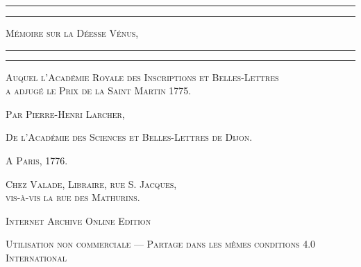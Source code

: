 \documentclass[a4paper, 18pt, oneside]{article}
\begin{document}
\begin{titlepage} %
	\centering %

	
	\rule{\textwidth}{1.6pt}\vspace*{-\baselineskip}\vspace*{2pt} %
	\rule{\textwidth}{0.4pt} %
	
	\vspace{1\baselineskip} %
	
	{\scshape\Huge Mémoire sur la Déesse Vénus,}
	
	\vspace{1\baselineskip} %

	\rule{\textwidth}{0.4pt}\vspace*{-\baselineskip}\vspace{3.2pt} %
	\rule{\textwidth}{1.6pt} %
	
	\vspace{1\baselineskip} %
	

 {\scshape Auquel l'Académie Royale des Inscriptions et Belles-Lettres\\ a adjugé le Prix de la Saint Martin 1775.} %

 	\vspace*{1\baselineskip} %

	{\scshape \Large Par Pierre-Henri Larcher,} %

 	\vspace*{1\baselineskip} %

{\scshape De l'Académie des Sciences et Belles-Lettres de Dijon.} %

\vspace*{\fill}

	\vspace{1\baselineskip}

	{\small\scshape A Paris, 1776.}
	
	{\small\scshape{Chez Valade, Libraire, rue S. Jacques,\\ vis-à-vis la rue des Mathurins.}}
	
	\vspace{0.5\baselineskip} %

\scshape Internet Archive Online Edition%
	
	{\scshape\small Utilisation non commerciale --- Partage dans les mêmes conditions 4.0 International} %
\end{titlepage}
\end{document}

